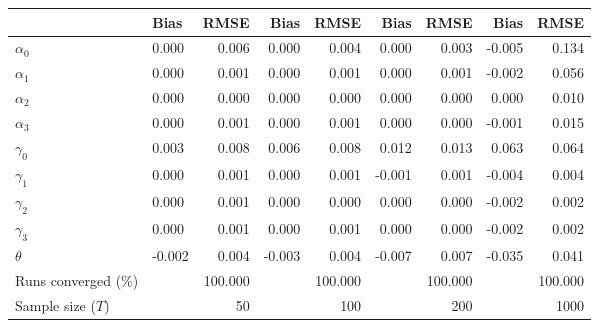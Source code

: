 
\begin{tabular}[t]{llrrrrrrr}
\toprule
  & Bias & RMSE & Bias & RMSE & Bias & RMSE & Bias & RMSE\\
\midrule
$\alpha_{0}$ & 0.000 & 0.006 & 0.000 & 0.004 & 0.000 & 0.003 & -0.005 & 0.134\\
$\alpha_{1}$ & 0.000 & 0.001 & 0.000 & 0.001 & 0.000 & 0.001 & -0.002 & 0.056\\
$\alpha_{2}$ & 0.000 & 0.000 & 0.000 & 0.000 & 0.000 & 0.000 & 0.000 & 0.010\\
$\alpha_{3}$ & 0.000 & 0.001 & 0.000 & 0.001 & 0.000 & 0.000 & -0.001 & 0.015\\
$\gamma_{0}$ & 0.003 & 0.008 & 0.006 & 0.008 & 0.012 & 0.013 & 0.063 & 0.064\\
$\gamma_{1}$ & 0.000 & 0.001 & 0.000 & 0.001 & -0.001 & 0.001 & -0.004 & 0.004\\
$\gamma_{2}$ & 0.000 & 0.001 & 0.000 & 0.000 & 0.000 & 0.000 & -0.002 & 0.002\\
$\gamma_{3}$ & 0.000 & 0.001 & 0.000 & 0.001 & 0.000 & 0.000 & -0.002 & 0.002\\
$\theta$ & -0.002 & 0.004 & -0.003 & 0.004 & -0.007 & 0.007 & -0.035 & 0.041\\
Runs converged (\%) &  & 100.000 &  & 100.000 &  & 100.000 &  & 100.000\\
Sample size ($T$) &  & 50 &  & 100 &  & 200 &  & 1000\\
\bottomrule
\end{tabular}
